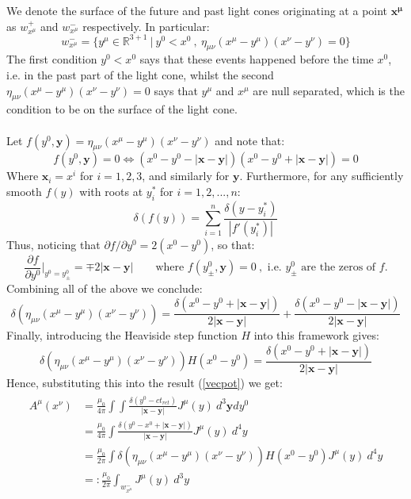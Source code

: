 \documentclass[a4paper]{article}
\numberwithin{equation}{section}
\begin{document}
We denote the surface of the future and past light cones originating at a point $\bm{x^\mu}$ as $w^+_{x^\mu}$ and $w^-_{x^\mu}$ respectively. In particular:
\begin{equation}
w^-_{x^\mu} = \{ y^\mu \in \mathbb{R}^{3+1} \ | \ y^0 < x^0 \ , \ \eta_{\mu \nu}(x^\mu - y^\mu )(x^\nu -y^\nu) = 0 \}
\end{equation}
The first condition $y^0 < x^0$ says that these events happened before the time $x^0$, i.e. in the past part of the light cone, whilst the second $\eta_{\mu \nu}(x^\mu - y^\mu )(x^\nu -y^\nu)=0$ says that $y^\mu$ and $x^\mu$ are null separated, which is the condition to be on the surface of the light cone.\\
\\
Let $f(y^0,\bm{y}) = \eta_{\mu \nu}(x^\mu - y^\mu )(x^\nu -y^\nu)$ and note that:
\begin{equation*}
f(y^0, \bm{y})=0 \iff (x^0-y^0 - |\bm{x} - \bm{y}|)(x^0 - y^0 + |\bm{x}-\bm{y}|)=0
\end{equation*}
Where $\bm{x}_i = x^i$ for $i=1,2,3$, and similarly for $\bm{y}$. Furthermore, for any sufficiently smooth $f(y)$ with roots at $y_i^*$ for $i=1,2,...,n$:
\begin{equation}\label{deltasum}
\delta(f(y)) = \sum_{i=1}^{n} \frac{\delta(y-y_i^*)}{|f'(y_i^*)|}
\end{equation}
Thus, noticing that $\partial f/ \partial y^0 = 2(x^0 - y^0)$, so that:
\begin{equation*}
\frac{\partial f}{\partial y^0}\bigg|_{y^0 = y^0_\pm} = \mp 2|\bm{x}-\bm{y}| \qquad \text{where } f(y^0_\pm, \bm{y}) =0 \ , \text{ i.e. } y^0_\pm \text{ are the zeros of } f.
\end{equation*}
Combining all of the above we conclude:
\begin{equation}
\delta(\eta_{\mu \nu}(x^\mu - y^\mu )(x^\nu -y^\nu)) = \frac{\delta(x^0 - y^0 +|\bm{x}-\bm{y}| )}{2|\bm{x}- \bm{y}|} + \frac{\delta(x^0 -y^0 - |\bm{x}-\bm{y}|)}{2|\bm{x}-\bm{y}|}
\end{equation}
Finally, introducing the Heaviside step function $H$ into this framework gives:
\begin{equation} \label{eq3}
\delta(\eta_{\mu \nu}(x^\mu - y^\mu )(x^\nu -y^\nu))H(x^0-y^0) = \frac{\delta(x^0 -y^0+|\bm{x}- \bm{y}|)}{2|\bm{x}-\bm{y}|}
\end{equation}
Hence, substituting this into the result (\ref{vecpot}) we get:
\begin{align} \label{vecpot3}
\begin{split}
A^\mu(x^\nu) &= \frac{\mu_0}{4 \pi} \int \int \frac{\delta (y^0 - c t_{ret})}{|\bm{x}-\bm{y}|} J^\mu(y) \ d^3 \bm{y} dy^0 \\
&= \frac{\mu_0}{4 \pi} \int \frac{\delta (y^0 - x^0 + |\bm{x} - \bm{y}|)}{|\bm{x}-\bm{y}|} J^\mu(y) \ d^4y \\
& = \frac{\mu_0}{2 \pi} \int \delta(\eta_{\mu \nu}(x^\mu - y^\mu )(x^\nu -y^\nu))H(x^0-y^0) J^\mu(y) \ d^4y \\
&=: \frac{\mu_0}{2 \pi} \int_{w^-_{x^\mu}} J^\mu(y) \ d^3 y
\end{split}
\end{align}
\end{document}
